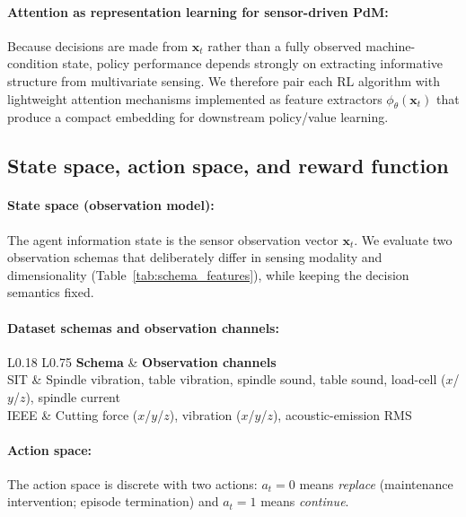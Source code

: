 \documentclass[sn-basic]{sn-jnl} %
\begin{document}
\paragraph{Attention as representation learning for sensor-driven PdM:}
Because decisions are made from $\mathbf{x}_t$ rather than a fully observed machine-condition state, policy performance depends strongly on extracting informative structure from multivariate sensing. We therefore pair each RL algorithm with lightweight attention mechanisms implemented as feature extractors $\phi_\theta(\mathbf{x}_t)$ that produce a compact embedding for downstream policy/value learning.

\subsection{State space, action space, and reward function}
\label{sec:mdp_components}

\paragraph{State space (observation model):}
The agent information state is the sensor observation vector $\mathbf{x}_t$. We evaluate two observation schemas that deliberately differ in sensing modality and dimensionality (Table~\ref{tab:schema_features}), while keeping the decision semantics fixed.

\paragraph{Dataset schemas and observation channels:}
\begin{table}[htbp]
\centering
\caption{Sensor channels used as observations by the RL environment}
\label{tab:schema_features}
	\begin{tabular}{L{0.18\linewidth} L{0.75\linewidth}}
	\toprule
	\textbf{Schema} & \textbf{Observation channels}\\
	\midrule
	SIT & Spindle vibration, table vibration, spindle sound, table sound, load-cell ($x$/$y$/$z$), spindle current\\
	IEEE & Cutting force ($x$/$y$/$z$), vibration ($x$/$y$/$z$), acoustic-emission RMS\\
	\bottomrule
	\end{tabular}
\end{table}

\paragraph{Action space:}
The action space is discrete with two actions: $a_t=0$ means \emph{replace} (maintenance intervention; episode termination) and $a_t=1$ means \emph{continue}. 
\end{document}
